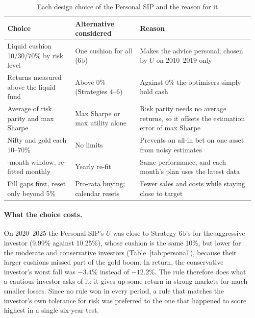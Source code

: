 \begin{table}[H]
\centering
\caption{Each design choice of the Personal SIP and the reason for it}
\label{tab:design-choices}
\small
\begin{tabularx}{\textwidth}{@{}>{\raggedright\arraybackslash}p{3.3cm}>{\raggedright\arraybackslash}p{3.3cm}>{\raggedright\arraybackslash}X@{}}
\toprule
Choice & Alternative considered & Reason \\
\midrule
Liquid cushion 10/30/70\% by risk level & One cushion for all (6b) & Makes the advice personal; chosen by $U$ on 2010--2019 only \\
Returns measured above the liquid fund & Above 0\% (Strategies 4--6) & Against 0\% the optimisers simply hold cash \\
Average of risk parity and max Sharpe & Max Sharpe or max utility alone & Risk parity needs no average returns, so it offsets the estimation error of max Sharpe \\
Nifty and gold each 10--70\% & No limits & Prevents an all-in bet on one asset from noisy estimates \\
120-month window, re-fitted monthly & Yearly re-fit & Same performance, and each month's plan uses the latest data \\
Fill gaps first, reset only beyond 5\% & Pro-rata buying; calendar resets & Fewer sales and costs while staying close to target \\
\bottomrule
\end{tabularx}
\end{table}

\paragraph{What the choice costs.} On 2020--2025 the Personal SIP's $U$ was close to Strategy 6b's
for the aggressive investor (9.99\% against 10.25\%), whose cushion is the same 10\%, but lower for
the moderate and conservative investors (Table~\ref{tab:personal}), because their larger cushions
missed part of the gold boom. In return, the conservative investor's worst fall was $-3.4\%$ instead
of $-12.2\%$. The rule therefore does what a cautious investor asks of it: it gives up some return in
strong markets for much smaller losses. Since no rule won in every period, a rule that matches the
investor's own tolerance for risk was preferred to the one that happened to score highest in a single
six-year test.
